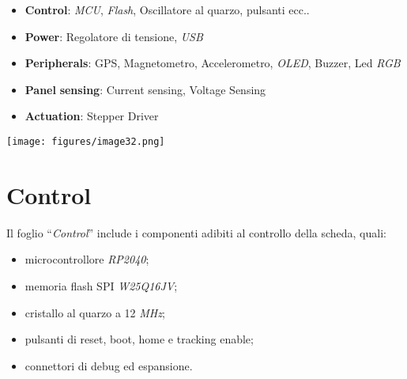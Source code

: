 \begin{itemize}
\item
  
  \textbf{Control}: \emph{MCU}, \emph{Flash}, Oscillatore al quarzo,
  pulsanti ecc..
  
\item
  
  \textbf{Power}: Regolatore di tensione, \emph{USB}
  
\item
  
  \textbf{Peripherals}: GPS, Magnetometro, Accelerometro, \emph{OLED},
  Buzzer, Led \emph{RGB}
  
\item
  
  \textbf{Panel} \textbf{sensing}: Current sensing, Voltage Sensing
  
\item
  
  \textbf{Actuation}: Stepper Driver
  
\end{itemize}

\begin{center}
\texttt{[image: figures/image32.png]}
\captionsetup{type=figure}
\end{center}

\hypertarget{control}{%
\section{Control}\label{control}}

Il foglio ``\emph{Control}'' include i componenti adibiti al controllo
della scheda, quali:

\begin{itemize}
\item
  
  microcontrollore \emph{RP2040};
  
\item
  
  memoria flash SPI \emph{W25Q16JV};
  
\item
  
  cristallo al quarzo a 12 \emph{MHz};
  
\item
  
  pulsanti di reset, boot, home e tracking enable;
  
\item
  
  connettori di debug ed espansione.
  
\end{itemize}

